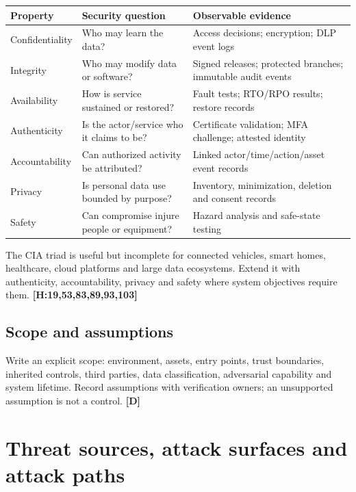 \documentclass[10pt,letterpaper,oneside]{article}
\newcommand{\handbookref}[1]{\textsf{\color{accent}\textbf{[H:#1]}}}
\newcommand{\designed}{\textsf{\color{accent}\textbf{[D]}}}
\begin{document}
\par\medskip\noindent\begin{tabularx}{\textwidth}{@{}>{\raggedright\arraybackslash}p{}>{\raggedright\arraybackslash}X >{\raggedright\arraybackslash}X@{}}\toprule
Property & Security question & Observable evidence \\ \midrule
Confidentiality & Who may learn the data? & Access decisions; encryption; DLP event logs \\
Integrity & Who may modify data or software? & Signed releases; protected branches; immutable audit events \\
Availability & How is service sustained or restored? & Fault tests; RTO/RPO results; restore records \\
Authenticity & Is the actor/service who it claims to be? & Certificate validation; MFA challenge; attested identity \\
Accountability & Can authorized activity be attributed? & Linked actor/time/action/asset event records \\
Privacy & Is personal data use bounded by purpose? & Inventory, minimization, deletion and consent records \\
Safety & Can compromise injure people or equipment? & Hazard analysis and safe-state testing \\
\bottomrule\end{tabularx}\par\medskip

The CIA triad is useful but incomplete for connected vehicles, smart homes, healthcare, cloud platforms and large data ecosystems. Extend it with authenticity, accountability, privacy and safety where system objectives require them. \handbookref{19,53,83,89,93,103}

\subsection{Scope and assumptions}
Write an explicit scope: environment, assets, entry points, trust boundaries, inherited controls, third parties, data classification, adversarial capability and system lifetime. Record assumptions with verification owners; an unsupported assumption is not a control. \designed{}

\section{Threat sources, attack surfaces and attack paths}
\end{document}
